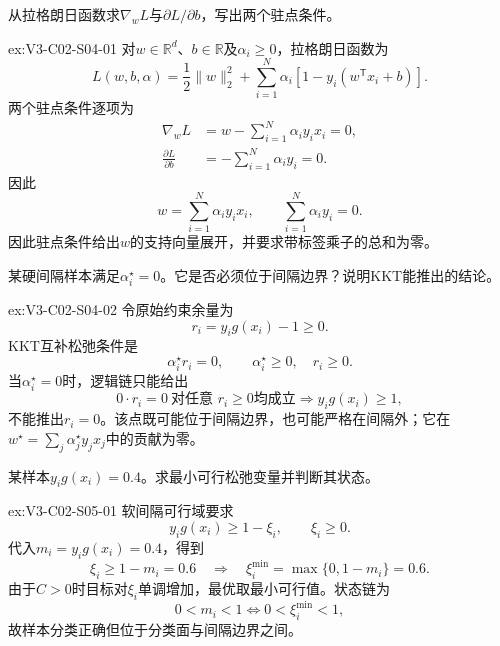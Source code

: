 \begin{SLChapterExercisePairSection}
\begin{exercise}\label{ex:V3-C02-S04-01}
从拉格朗日函数求$\nabla_wL$与$\partial L/\partial b$，写出两个驻点条件。
\end{exercise}
\ifSLFullEdition
{}\label{sol:V3-C02-S04-01}
\begin{chapterexercisesolution}{ex:V3-C02-S04-01}
对$w\in\mathbb R^d$、$b\in\mathbb R$及$\alpha_i\geq0$，拉格朗日函数为
\[
L(w,b,\alpha)=\frac12\lVert w\rVert_2^2
+\sum_{i=1}^{N}\alpha_i\left[1-y_i(w^{\mathsf T}x_i+b)\right].
\]
两个驻点条件逐项为
\[
\begin{aligned}
\nabla_wL
&=w-\sum_{i=1}^{N}\alpha_i y_i x_i=0,\\
\frac{\partial L}{\partial b}
&=-\sum_{i=1}^{N}\alpha_i y_i=0.
\end{aligned}
\]
因此
\[
w=\sum_{i=1}^{N}\alpha_i y_i x_i,
\qquad
\sum_{i=1}^{N}\alpha_i y_i=0.
\]
因此驻点条件给出$w$的支持向量展开，并要求带标签乘子的总和为零。
\end{chapterexercisesolution}
\fi

\begin{exercise}\label{ex:V3-C02-S04-02}
某硬间隔样本满足$\alpha_i^\star=0$。它是否必须位于间隔边界？说明KKT能推出的结论。
\end{exercise}
\ifSLFullEdition
{}\label{sol:V3-C02-S04-02}
\begin{chapterexercisesolution}{ex:V3-C02-S04-02}
令原始约束余量为
\[
r_i=y_i g(x_i)-1\geq0.
\]
KKT互补松弛条件是
\[
\alpha_i^\star r_i=0,
\qquad
\alpha_i^\star\geq0,\quad r_i\geq0.
\]
当$\alpha_i^\star=0$时，逻辑链只能给出
\[
0\cdot r_i=0\ \text{对任意 }r_i\geq0\text{均成立}
\Longrightarrow y_i g(x_i)\geq1,
\]
不能推出$r_i=0$。该点既可能位于间隔边界，也可能严格在间隔外；它在$w^\star=\sum_j\alpha_j^\star y_jx_j$中的贡献为零。
\end{chapterexercisesolution}
\fi

\begin{exercise}\label{ex:V3-C02-S05-01}
某样本$y_ig(x_i)=0.4$。求最小可行松弛变量并判断其状态。
\end{exercise}
\ifSLFullEdition
{}\label{sol:V3-C02-S05-01}
\begin{chapterexercisesolution}{ex:V3-C02-S05-01}
软间隔可行域要求
\[
y_i g(x_i)\geq1-\xi_i,
\qquad
\xi_i\geq0.
\]
代入$m_i=y_ig(x_i)=0.4$，得到
\[
\xi_i\geq1-m_i=0.6
\quad\Longrightarrow\quad
\xi_i^{\min}=\max\{0,1-m_i\}=0.6.
\]
由于$C>0$时目标对$\xi_i$单调增加，最优取最小可行值。状态链为
\[
0<m_i<1
\Longleftrightarrow
0<\xi_i^{\min}<1,
\]
故样本分类正确但位于分类面与间隔边界之间。
\end{chapterexercisesolution}
\fi


\end{SLChapterExercisePairSection}
